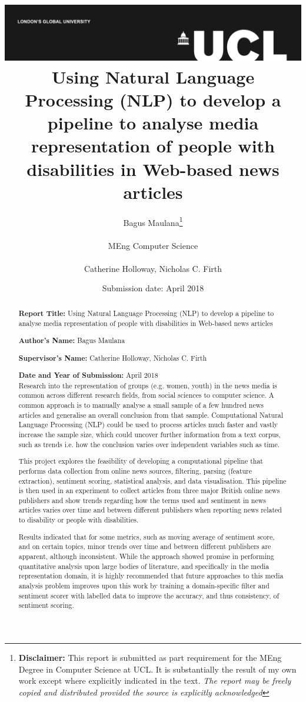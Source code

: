 \documentclass{report}
\title{{\vspace{-14em} \includegraphics[scale=0.4]{ucl_logo.png}}\\
{{\Huge Using Natural Language Processing (NLP) to develop a pipeline to analyse media representation of people with disabilities in Web-based news articles}}\\
}
\date{Submission date: \nth{30} April 2018}
\author{Bagus Maulana\thanks{
{\bf Disclaimer:}
This report is submitted as part requirement for the MEng Degree in Computer Science at UCL. It is
substantially the result of my own work except where explicitly indicated in the text.
\emph{The report may be freely copied and distributed provided the source is explicitly acknowledged}}
\\ \\
MEng Computer Science\\ \\
Catherine Holloway, Nicholas C. Firth}
\begin{document}
 
\onehalfspacing
\maketitle
\begin{abstract}

\textbf{Report Title:}  Using Natural Language Processing (NLP) to develop a pipeline to analyse media representation of people with disabilities in Web-based news articles

\textbf{Author’s Name:} Bagus Maulana

\textbf{Supervisor’s Name:} Catherine Holloway, Nicholas C. Firth

\textbf{Date and Year of Submission:}  April 2018\\

Research into the representation of groups (e.g. women, youth) in the news media is common across different research fields, from social sciences to computer science.
A common approach is to manually analyse a small sample of a few hundred news articles and generalise an overall conclusion from that sample. 
Computational Natural Language Processing (NLP) could be used to process articles much faster and vastly increase the sample size, which could uncover further information from a text corpus, such as trends i.e. how the conclusion varies over independent variables such as time.

This project explores the feasibility of developing a computational pipeline that performs data collection from online news sources, filtering, parsing (feature extraction), sentiment scoring, statistical analysis, and data visualisation.
This pipeline is then used in an experiment to collect articles from three major British online news publishers and show trends regarding how the terms used and sentiment in news articles varies over time and between different publishers when reporting news related to disability or people with disabilities.

Results indicated that for some metrics, such as moving average of sentiment score, and on certain topics, minor trends over time and between different publishers are apparent, although inconsistent. 
While the approach showed promise in performing quantitative analysis upon large bodies of literature, and specifically in the media representation domain, it is highly recommended that future approaches to this media analysis problem improves upon this work by training a domain-specific filter and sentiment scorer with labelled data to improve the accuracy, and thus consistency, of sentiment scoring.

\end{abstract}
\tableofcontents
\setcounter{page}{1}
\end{document}
